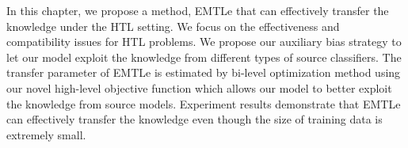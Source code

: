 In this chapter, we propose a method, EMTLe that can effectively transfer the knowledge under the HTL setting. We focus on the effectiveness and compatibility issues for HTL problems. We propose our auxiliary bias strategy to let our model exploit the knowledge from different types of source classifiers. The transfer parameter of EMTLe is estimated by bi-level optimization method using our novel high-level objective function which allows our model to better exploit the knowledge from source models. Experiment results demonstrate that EMTLe can effectively transfer the knowledge even though the size of training data is extremely small.

